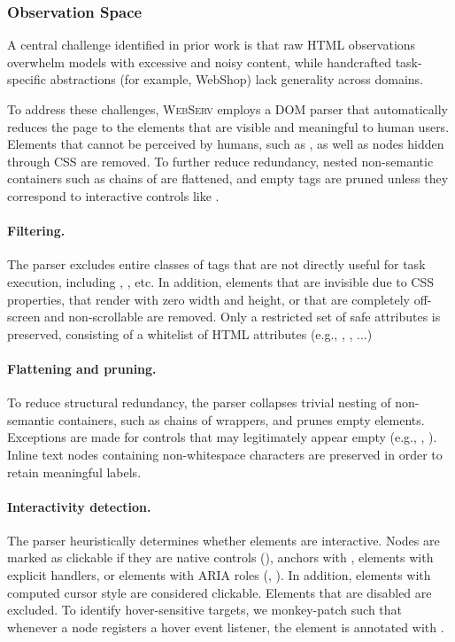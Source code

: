 \documentclass{article}
\DeclareRobustCommand{\projectname}{\textsc{WebServ}\xspace}
\begin{document}
\subsubsection{Observation Space}
A central challenge identified in prior work is that raw HTML observations overwhelm models with excessive and noisy content, while handcrafted task-specific abstractions (for example, WebShop) lack generality across domains.

To address these challenges, \projectname employs a DOM parser that automatically reduces the page to the elements that are visible and meaningful to human users. Elements that cannot be perceived by humans, such as ,  as well as nodes hidden through CSS are removed. To further reduce redundancy, nested non-semantic containers such as chains of  are flattened, and empty tags are pruned unless they correspond to interactive controls like .  

\paragraph{Filtering.} The parser excludes entire classes of tags that are not directly useful for task execution, including , , etc. In addition, elements that are invisible due to CSS properties, that render with zero width and height, or that are completely off-screen and non-scrollable are removed. Only a restricted set of safe attributes is preserved, consisting of a whitelist of HTML attributes (e.g., , , ...)

\paragraph{Flattening and pruning.} To reduce structural redundancy, the parser collapses trivial nesting of non-semantic containers, such as chains of  wrappers, and prunes empty elements. Exceptions are made for controls that may legitimately appear empty (e.g., , ). Inline text nodes containing non-whitespace characters are preserved in order to retain meaningful labels.

\paragraph{Interactivity detection.} The parser heuristically determines whether elements are interactive. Nodes are marked as clickable if they are native controls (), anchors with , elements with explicit  handlers, or elements with ARIA roles (, ). In addition, elements with computed cursor style  are considered clickable. Elements that are disabled are excluded. To identify hover-sensitive targets, we monkey-patch  such that whenever a node registers a hover event listener, the element is annotated with . 
\end{document}
